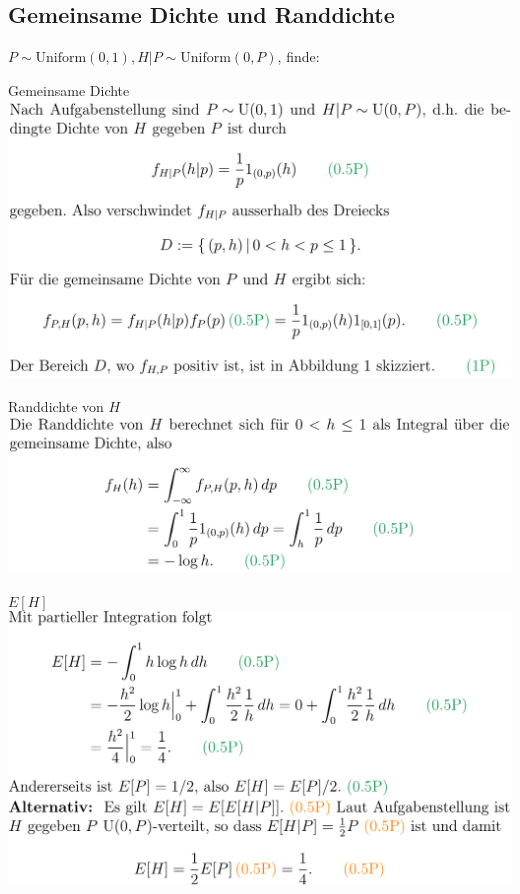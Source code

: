 \subsection{Gemeinsame Dichte und Randdichte}
$P \sim \text{Uniform}(0,1), H|P \sim \text{Uniform}(0,P)$, finde:
\begin{itemize*}
    \item Gemeinsame Dichte
    \\\includegraphics[width=\linewidth]{./Figures/Gemeinsame_Dichte_Randdichte_A.png}
    \item Randdichte von $H$
    \\\includegraphics[width=\linewidth]{./Figures/Gemeinsame_Dichte_Randdichte_B.png}
    \item $E[H]$
    \\\includegraphics[width=\linewidth]{./Figures/Gemeinsame_Dichte_Randdichte_C.png}
\end{itemize*}
